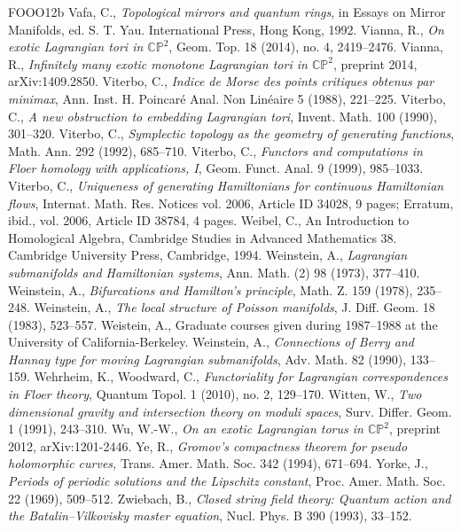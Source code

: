 \begin{thebibliography}{FOOO12b}
 Vafa, C., \textit{Topological mirrors and quantum rings}, in Essays on Mirror Manifolds, ed. S. T. Yau. International Press, Hong Kong, 1992.
 Vianna, R., \textit{On exotic Lagrangian tori in $\mathbb{CP}^2$}, Geom. Top. 18 (2014), no. 4, 2419--2476.
 Vianna, R., \textit{Infinitely many exotic monotone Lagrangian tori in $\mathbb{CP}^2$}, preprint 2014, arXiv:1409.2850.
 Viterbo, C., \textit{Indice de Morse des points critiques obtenus par minimax}, Ann. Inst. H. Poincaré Anal. Non Linéaire 5 (1988), 221--225.
 Viterbo, C., \textit{A new obstruction to embedding Lagrangian tori}, Invent. Math. 100 (1990), 301--320.
 Viterbo, C., \textit{Symplectic topology as the geometry of generating functions}, Math. Ann. 292 (1992), 685--710.
 Viterbo, C., \textit{Functors and computations in Floer homology with applications, I}, Geom. Funct. Anal. 9 (1999), 985--1033.
 Viterbo, C., \textit{Uniqueness of generating Hamiltonians for continuous Hamiltonian flows}, Internat. Math. Res. Notices vol. 2006, Article ID 34028, 9 pages; Erratum, ibid., vol. 2006, Article ID 38784, 4 pages.
 Weibel, C., An Introduction to Homological Algebra, Cambridge Studies in Advanced Mathematics 38. Cambridge University Press, Cambridge, 1994.
 Weinstein, A., \textit{Lagrangian submanifolds and Hamiltonian systems}, Ann. Math. (2) 98 (1973), 377--410.
 Weinstein, A., \textit{Bifurcations and Hamilton\textquoteright{}s principle}, Math. Z. 159 (1978), 235--248.
 Weinstein, A., \textit{The local structure of Poisson manifolds}, J. Diff. Geom. 18 (1983), 523--557.
 Weistein, A., Graduate courses given during 1987--1988 at the University of California-Berkeley.
 Weinstein, A., \textit{Connections of Berry and Hannay type for moving Lagrangian submanifolds}, Adv. Math. 82 (1990), 133--159.
 Wehrheim, K., Woodward, C., \textit{Functoriality for Lagrangian correspondences in Floer theory}, Quantum Topol. 1 (2010), no. 2, 129--170.
 Witten, W., \textit{Two dimensional gravity and intersection theory on moduli spaces}, Surv. Differ. Geom. 1 (1991), 243--310.
 Wu, W.-W., \textit{On an exotic Lagrangian torus in $\mathbb{CP}^2$}, preprint 2012, arXiv:1201-2446.
 Ye, R., \textit{Gromov\textquoteright{}s compactness theorem for pseudo holomorphic curves,} Trans. Amer. Math. Soc. 342 (1994), 671--694.
 Yorke, J., \textit{Periods of periodic solutions and the Lipschitz constant}, Proc. Amer. Math. Soc. 22 (1969), 509--512.
 Zwiebach, B., \textit{Closed string field theory: Quantum action and the Batalin--Vilkovisky master equation}, Nucl. Phys. B 390 (1993), 33--152.
\end{thebibliography}
